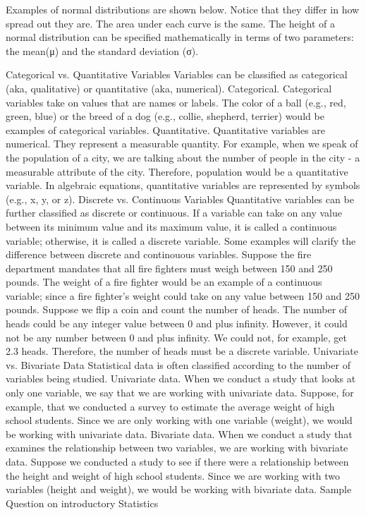 Examples of normal distributions are shown below. Notice that they differ in how spread out they are. The area under each curve is the same. The height of a normal distribution can be specified mathematically in terms of two parameters: the mean(μ) and the standard deviation (σ). 




Categorical vs. Quantitative Variables
Variables can be classified as categorical (aka, qualitative) or quantitative (aka, numerical).
Categorical. Categorical variables take on values that are names or labels. The color of a ball (e.g., red, green, blue) or the breed of a dog (e.g., collie, shepherd, terrier) would be examples of categorical variables. 
Quantitative. Quantitative variables are numerical. They represent a measurable quantity. For example, when we speak of the population of a city, we are talking about the number of people in the city - a measurable attribute of the city. Therefore, population would be a quantitative variable.
In algebraic equations, quantitative variables are represented by symbols (e.g., x, y, or z).
Discrete vs. Continuous Variables
Quantitative variables can be further classified as discrete or continuous. If a variable can take on any value between its minimum value and its maximum value, it is called a continuous variable; otherwise, it is called a discrete variable.
Some examples will clarify the difference between discrete and continouous variables.
Suppose the fire department mandates that all fire fighters must weigh between 150 and 250 pounds. The weight of a fire fighter would be an example of a continuous variable; since a fire fighter's weight could take on any value between 150 and 250 pounds. 
Suppose we flip a coin and count the number of heads. The number of heads could be any integer value between 0 and plus infinity. However, it could not be any number between 0 and plus infinity. We could not, for example, get 2.3 heads. Therefore, the number of heads must be a discrete variable.
Univariate vs. Bivariate Data
Statistical data is often classified according to the number of variables being studied.
Univariate data. When we conduct a study that looks at only one variable, we say that we are working with univariate data. Suppose, for example, that we conducted a survey to estimate the average weight of high school students. Since we are only working with one variable (weight), we would be working with univariate data.
Bivariate data. When we conduct a study that examines the relationship between two variables, we are working with bivariate data. Suppose we conducted a study to see if there were a relationship between the height and weight of high school students. Since we are working with two variables (height and weight), we would be working with bivariate data.
Sample Question on introductory Statistics

